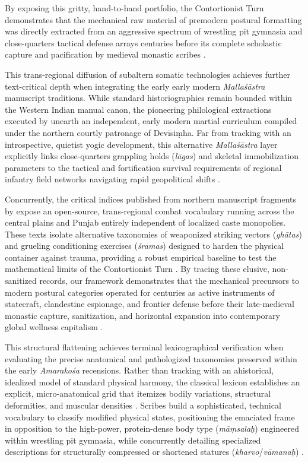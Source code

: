 \documentclass[11pt,twoside,letterpaper]{article}
\begin{document}
By exposing this gritty, hand-to-hand portfolio, the Contortionist Turn demonstrates that the mechanical raw material of premodern postural formatting was directly extracted from an aggressive spectrum of wrestling pit gymnasia and close-quarters tactical defense arrays centuries before its complete scholastic capture and pacification by medieval monastic scribes \citep{MP_7_v49, Wujastyk2025}.

This trans-regional diffusion of subaltern somatic technologies achieves further text-critical depth when integrating the early early modern \textit{Malla\'s\={a}stra} manuscript traditions. While standard historiographies remain bounded within the Western Indian manual canon, the pioneering philological extractions executed by \citet{Kulkarni1959} unearth an independent, early modern martial curriculum compiled under the northern courtly patronage of Dev\={i}si\d{m}ha. Far from tracking with an introspective, quietist yogic development, this alternative \textit{Malla\'s\={a}stra} layer explicitly links close-quarters grappling holds (\textit{l\={a}gas}) and skeletal immobilization parameters to the tactical and fortification survival requirements of regional infantry field networks navigating rapid geopolitical shifts \citep{Kulkarni1959}. 

Concurrently, the critical indices published from northern manuscript fragments by \citet{Kulkarni1974} expose an open-source, trans-regional combat vocabulary running across the central plains and Punjab entirely independent of localized caste monopolies. These texts isolate alternative taxonomies of weaponized striking vectors (\textit{gh\={a}tas}) and grueling conditioning exercises (\textit{\'sramas}) designed to harden the physical container against trauma, providing a robust empirical baseline to test the mathematical limits of the Contortionist Turn \citep{Kulkarni1974}. By tracing these elusive, non-sanitized records, our framework demonstrates that the mechanical precursors to modern postural categories operated for centuries as active instruments of statecraft, clandestine espionage, and frontier defense before their late-medieval monastic capture, sanitization, and horizontal expansion into contemporary global wellness capitalism \citep{Kulkarni1959, Kulkarni1974, Wujastyk2025}.

This structural flattening achieves terminal lexicographical verification when evaluating the precise anatomical and pathologized taxonomies preserved within the early \textit{Amarako\'sa} recensions. Rather than tracking with an ahistorical, idealized model of standard physical harmony, the classical lexicon establishes an explicit, micro-anatomical grid that itemizes bodily variations, structural deformities, and muscular densities \citep{Thomas2025}. Scribes build a sophisticated, technical vocabulary to classify modified physical states, positioning the emaciated frame in opposition to the high-power, protein-dense body type (\textit{m\={a}\d{m}sala\d{h}}) engineered within wrestling pit gymnasia, while concurrently detailing specialized descriptions for structurally compressed or shortened statures (\textit{kharvo}/\textit{v\={a}mana\d{h}}) \citep{MP_7_v50}. 
\end{document}
